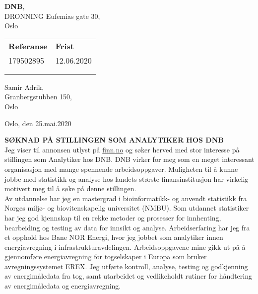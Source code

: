 \documentclass{article}
\begin{document}
\vspace*{0,10\textheight}
\small

\noindent\textbf{DNB},\\
\noindent DRONNING Eufemias gate 30,\\ 
 Oslo\\

\begin{tabular}{ l l }
\hspace*{-0.75cm}\textbf{Referanse} & \textbf{Frist}\\
\hspace*{-0.75cm}179502895 & 12.06.2020\\
&\\
&
\end{tabular}

\noindent Samir Adrik,\\
\noindent Granbergstubben 150,\\
 Oslo\\

\begin{flushright}
Oslo, den 25.mai.2020
\end{flushright}

\noindent \textbf{SØKNAD PÅ STILLINGEN SOM ANALYTIKER HOS DNB}\\

\noindent Jeg viser til annonsen utlyst på \href{https://www.finn.no/job/fulltime/ad.html?finnkode=179502895}{finn.no} og søker herved med stor interesse på stillingen som Analytiker hos DNB. DNB virker for meg som en meget interessant organisasjon med mange spennende arbeidsoppgaver. Muligheten til å kunne jobbe med statistikk og analyse hos landets største finansinstitusjon har virkelig motivert meg til å søke på denne stillingen.\\

\noindent Av utdannelse har jeg en mastergrad i bioinformatikk- og anvendt statistikk fra Norges miljø- og biovitenskapelig universitet (NMBU). Som utdannet statistiker har jeg god kjennskap til en rekke metoder og prosesser for innhenting, bearbeiding og testing av data for innsikt og analyse. Arbeidserfaring har jeg fra et opphold hos Bane NOR Energi, hvor jeg jobbet som analytiker innen energiavregning i infrastrukturavdelingen. Arbeidsoppgavene mine gikk ut på å gjennomføre energiavregning for togselskaper i Europa som bruker avregningssystemet EREX. Jeg utførte kontroll, analyse, testing og godkjenning av energimåledata fra tog, samt utarbeidet og vedlikeholdt rutiner for håndtering av energimåledata og energiavregning.\\
\end{document}
